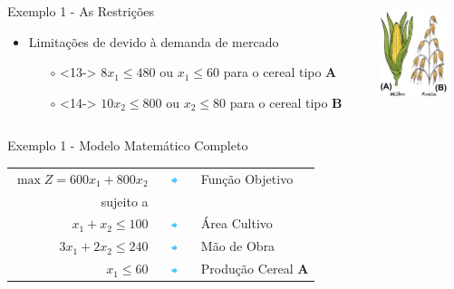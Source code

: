 \documentclass{beamer}
\begin{document}
\begin{frame}
{\begin{columns}
\begin{column}{0.7\textwidth}
\begin{exampleblock}{Exemplo 1 - As Restrições}
\begin{itemize}
				\item<12-> {Limitações de devido à demanda de mercado}				
					\begin{itemize}
					\item[$\circ$]<13->  $8x_1 \le 480$ ou $x_1 \le 60$ para o cereal tipo \textbf{A}
					\item[$\circ$]<14->  $10x_2 \le 800$ ou $x_2 \le 80$ para o cereal tipo \textbf{B}
					\end{itemize}
				\end{itemize}
			\end{exampleblock}
		\end{column}
		\begin{column}{0.3\textwidth}
			\centering
			\includegraphics[width=2cm,height=3cm]{milho_aveia2.png}
		\end{column}
	\end{columns}
	}
	{
	\begin{columns}
		\begin{column}{0.7\textwidth}
			\centering
			\begin{exampleblock}{Exemplo 1 - Modelo Matemático Completo}
				\scriptsize
				\begin{table}
					\begin{tabular}{r c l}
						$ \max Z = 600x_1+800x_2$ & \includegraphics[width=0.8cm,height=0.2cm]{seta2.png} & Função Objetivo \\
						sujeito a & & \\
						$x_1+x_2 \le 100$ & \includegraphics[width=0.8cm,height=0.2cm]{seta2.png}& Área Cultivo \\
						$3x_1+2x_2 \le 240$ & \includegraphics[width=0.8cm,height=0.2cm]{seta2.png}& Mão de Obra \\
						$x_1 \le 60 $ & \includegraphics[width=0.8cm,height=0.2cm]{seta2.png}& Produção Cereal \textbf{A} \\

\end{tabular}
\end{table}
\end{exampleblock}
\end{column}
\end{columns}}
\end{frame}
\end{document}
